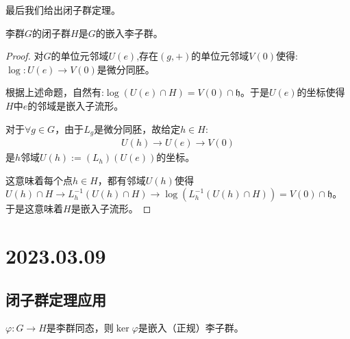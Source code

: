 最后我们给出闭子群定理。
\begin{theorem}[Cartan]
    李群$G$的闭子群$H$是$G$的嵌入李子群。
\end{theorem}
\begin{proof}
    对$G$的单位元邻域$U(e)$,存在$(g,+)$的单位元邻域$V(0)$使得:$\log:U(e) \to V(0)$是微分同胚。

    根据上述命题，自然有:$\log(U(e)\cap H)=V(0)\cap \mathfrak{h}$。于是$U(e)$的坐标使得$H$中$e$的邻域是嵌入子流形。

    对于$\forall g \in G$，由于$L_g$是微分同胚，故给定$h \in H$:
    \begin{align}
        U(h)\to U(e) \to V(0)
    \end{align}
    是$h$邻域$U(h):=(L_h)(U(e))$的坐标。

    这意味着每个点$h \in H$，都有邻域$U(h)$使得$U(h)\cap H \to L_h^{-1}(U(h)\cap H) \to \log(L_h^{-1}(U(h)\cap H))=V(0)\cap \mathfrak{h}$。于是这意味着$H$是嵌入子流形。
\end{proof}
\chapter{2023.03.09}
\section{闭子群定理应用}
\begin{proposition}
    $\varphi: G \to H$是李群同态，则$\ker \varphi$是嵌入（正规）李子群。
\end{proposition}

